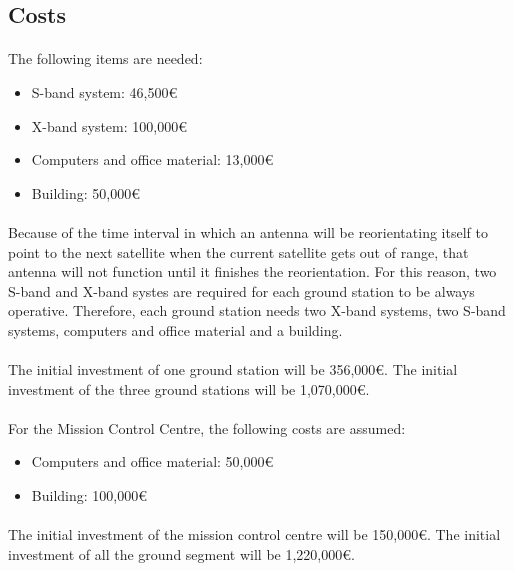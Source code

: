 \subsection{Costs}

\paragraph{}The following items are needed:
\begin{itemize}
\item S-band system: 46,500\euro
\item X-band system: 100,000\euro
\item Computers and office material: 13,000\euro
\item Building: 50,000\euro
\end{itemize}

\paragraph{}Because of the time interval in which an antenna will be reorientating itself to point to the next satellite when the current satellite gets out of range, that antenna will not function until it finishes the reorientation. For this reason, two S-band and X-band systes are required for each ground station to be always operative. Therefore, each ground station needs two X-band systems, two S-band systems, computers and office material and a building.

\paragraph{}The initial investment of one ground station will be 356,000\euro . The initial investment of the three ground stations will be 1,070,000\euro .

\paragraph{}For the Mission Control Centre, the following costs are assumed:
\begin{itemize}
\item Computers and office material: 50,000\euro
\item Building: 100,000\euro
\end{itemize}
\paragraph{}The initial investment of the mission control centre will be 150,000\euro . The initial investment of all the ground segment will be 1,220,000\euro .